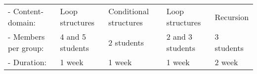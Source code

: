 \begin{longtable}[c]{lllll}
- Content-domain:                                                         & Loop structures                                                                                                                                                                                                    & Conditional structures                                                                                                                                                            & Loop structures                                                                                                                                                                         & Recursion                                                                                                                                                                                                                                                          \\
- Members per group:                                                      & 4 and 5 students                                                                                                                                                                                                   & 2 students                                                                                                                                                                        & 2 and 3 students                                                                                                                                                                        & 3 students                                                                                                                                                                                                                                                         \\
- Duration:                                                               & 1 week                                                                                                                                                                                                             & 1 week                                                                                                                                                                            & 1 week                                                                                                                                                                                  & 2 week                                                                                                                                                                                                                                                             \\

\end{longtable}
